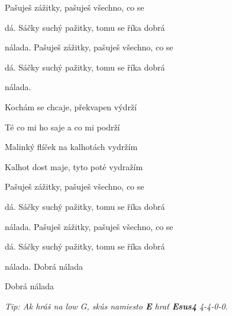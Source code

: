 \begin{song}
 Pašuješ zážitky, pašuješ všechno, co se \par
{}dá. Sáčky suchý pažitky, tomu se říka dobrá \par
nálada. Pašuješ zážitky, pašuješ všechno, co se \par
{}dá. Sáčky suchý pažitky, tomu se říka dobrá \par
nálada.    \par
{}    \par

\bigskip

Kochám se chcaje, překvapen výdrží \par
Té co mi ho saje a co mi podrží \par
Malinký flíček na kalhotách vydržím \par
Kalhot dost maje, tyto poté vydražím \par

\bigskip

 Pašuješ zážitky, pašuješ všechno, co se \par
{}dá. Sáčky suchý pažitky, tomu se říka dobrá \par
nálada. Pašuješ zážitky, pašuješ všechno, co se \par
{}dá. Sáčky suchý pažitky, tomu se říka dobrá \par

\bigskip

nálada.   Dobrá nálada  \par
{} Dobrá nálada   \par
{}  \par

\bigskip
\bigskip

\textit{\smaller
Tip: Ak hráš na low G, skús namiesto \textbf{E} hrať \textbf{Esus4} 4-4-0-0.
}

\end{song}
